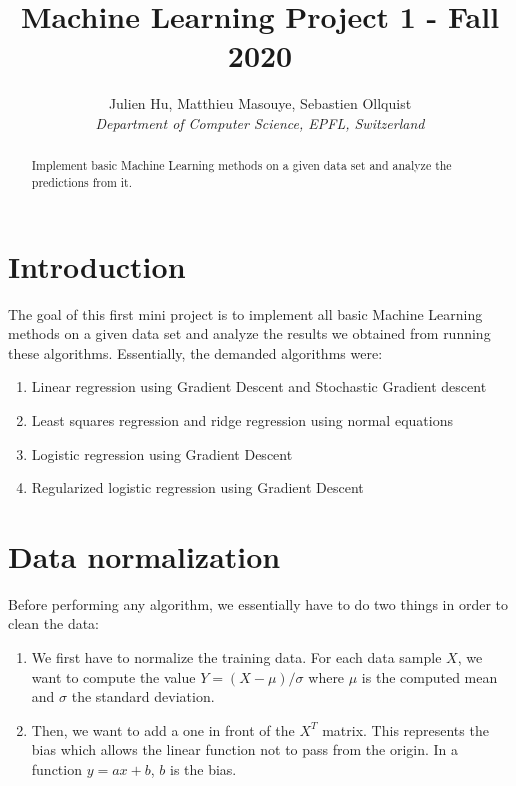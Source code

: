\documentclass[10pt,conference,compsocconf]{IEEEtran}
\begin{document}
\title{Machine Learning Project 1 - Fall 2020}

\author{
  Julien Hu, Matthieu Masouye, Sebastien Ollquist\\
  \textit{Department of Computer Science, EPFL, Switzerland}
}

\maketitle

\begin{abstract}
  Implement basic Machine Learning methods on a given data set and analyze the predictions from it.
\end{abstract}

\section{Introduction}
The goal of this first mini project is to implement all basic Machine Learning methods on a given data set and analyze the results we obtained from running these algorithms. Essentially, the demanded algorithms were:
\begin{enumerate}
  \item Linear regression using Gradient Descent and Stochastic Gradient descent
  \item Least squares regression and ridge regression using normal equations
  \item Logistic regression using Gradient Descent
  \item Regularized logistic regression using Gradient Descent
\end{enumerate}

\section{Data normalization}
Before performing any algorithm, we essentially have to do two things in order to clean the data:
\begin{enumerate}
  \item We first have to normalize the training data. For each data sample $X$, we want to compute the value $Y=(X-\mu)/\sigma$ where $\mu$ is the computed mean and $\sigma$ the standard deviation.
  \item Then, we want to add a one in front of the $X^T$ matrix. This represents the bias which allows the linear function not to pass from the origin. In a function $y=ax+b$, $b$ is the bias.
\end{enumerate}
\end{document}
